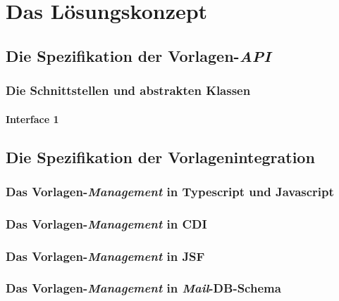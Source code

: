 \chapter{Das Lösungskonzept}
\label{cha:Lösungskonzept}
\section{Die Spezifikation der Vorlagen-\emph{API}}

\subsection{Die Schnittstellen und abstrakten Klassen}

\subsubsection{Interface 1}


\section{Die Spezifikation der Vorlagenintegration}
\subsection{Das Vorlagen-\emph{Management} in Typescript und Javascript}

\subsection{Das Vorlagen-\emph{Management} in CDI}

\subsection{Das Vorlagen-\emph{Management} in JSF}

\subsection{Das Vorlagen-\emph{Management} in \emph{Mail}-DB-Schema}

